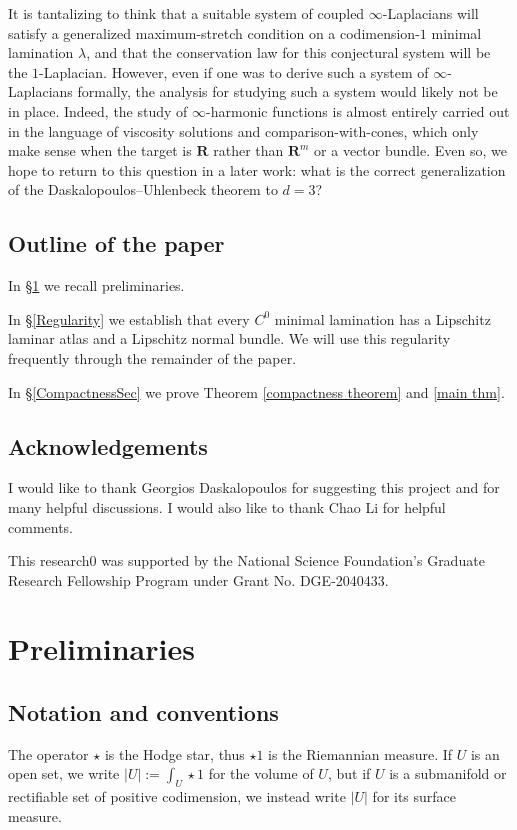 \documentclass[reqno,11pt]{amsart}
\newcommand{\RR}{\mathbf{R}}
\theoremstyle{definition}
\numberwithin{equation}{section}
\begin{document}
It is tantalizing to think that a suitable system of coupled $\infty$-Laplacians will satisfy a generalized maximum-stretch condition on a codimension-$1$ minimal lamination $\lambda$, and that the conservation law for this conjectural system will be the $1$-Laplacian.
However, even if one was to derive such a system of $\infty$-Laplacians formally, the analysis for studying such a system would likely not be in place.
Indeed, the study of $\infty$-harmonic functions is almost entirely carried out in the language of viscosity solutions and comparison-with-cones, which only make sense when the target is $\RR$ rather than $\RR^m$ or a vector bundle.
Even so, we hope to return to this question in a later work: what is the correct generalization of the Daskalopoulos--Uhlenbeck theorem to $d = 3$?

\subsection{Outline of the paper}
In \S\ref{Prelims} we recall preliminaries.

In \S\ref{Regularity} we establish that every $C^0$ minimal lamination has a Lipschitz laminar atlas and a Lipschitz normal bundle.
We will use this regularity frequently through the remainder of the paper.

In \S\ref{CompactnessSec} we prove Theorem \ref{compactness theorem} and \ref{main thm}.


\subsection{Acknowledgements}
I would like to thank Georgios Daskalopoulos for suggesting this project and for many helpful discussions.
I would also like to thank Chao Li for helpful comments.

This research0 was supported by the National Science Foundation's Graduate Research Fellowship Program under Grant No. DGE-2040433.




\section{Preliminaries}\label{Prelims}
\subsection{Notation and conventions}
The operator $\star$ is the Hodge star, thus $\star 1$ is the Riemannian measure.
If $U$ is an open set, we write $|U| := \int_U \star 1$ for the volume of $U$, but if $U$ is a submanifold or rectifiable set of positive codimension, we instead write $|U|$ for its surface measure.
\end{document}
